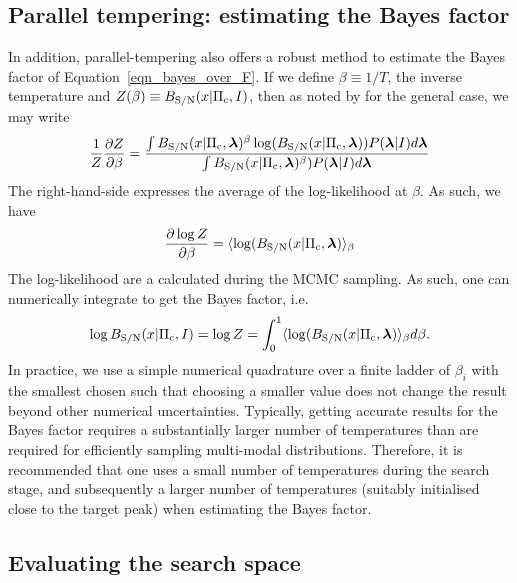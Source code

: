 \documentclass[aps, prd, twocolumn, superscriptaddress, floatfix, showpacs, nofootinbib, longbibliography]{revtex4-1}
\begin{document}
\subsection{Parallel tempering: estimating the Bayes factor}
In addition, parallel-tempering also offers a robust method to estimate the
Bayes factor of Equation~\eqref{eqn_bayes_over_F}. If we define
$\beta\equiv1/T$, the inverse temperature and $Z(\beta)\equiv B_{\rm S/N}(x| \Pi_{\rm
c}, I)$, then as noted by \citet{goggans2004} for the general case, we may
write
\begin{align}
\frac{1}{Z} \frac{\partial Z}{\partial \beta}=
\frac{
\int B_{\rm S/N}(x| \Pi_{\rm c}, \boldsymbol{\mathbf{\lambda}})^{\beta}
\log(B_{\rm S/N}(x| \Pi_{\rm c}, \boldsymbol{\mathbf{\lambda}}))P(\boldsymbol{\mathbf{\lambda}}| I)
d\boldsymbol{\mathbf{\lambda}}
}
{
\int B_{\rm S/N}(x| \Pi_{\rm c}, \boldsymbol{\mathbf{\lambda}})^{\beta})P(\boldsymbol{\mathbf{\lambda}}| I)
d\boldsymbol{\mathbf{\lambda}}
}
\end{align}
The right-hand-side expresses the average of the log-likelihood at $\beta$. As
such, we have
\begin{align}
\frac{\partial \log Z}{\partial \beta} =
\langle \log(B_{\rm S/N}(x| \Pi_{\rm c}, \boldsymbol{\mathbf{\lambda}}) \rangle_{\beta}
\end{align}
The log-likelihood are a calculated during the MCMC sampling. As such, one
can numerically integrate to get the Bayes factor, i.e.
\begin{align}
\log B_{\rm S/N}(x| \Pi_{\rm c}, I) = \log Z = \int_{0}^{1}
\langle \log(B_{\rm S/N}(x| \Pi_{\rm c}, \boldsymbol{\mathbf{\lambda}}) \rangle_{\beta} d\beta.
\end{align}
In practice, we use a simple numerical quadrature over a finite ladder of
$\beta_i$ with the smallest chosen such that choosing a smaller value does not
change the result beyond other numerical uncertainties. Typically, getting
accurate results for the Bayes factor requires a substantially larger number of
temperatures than are required for efficiently sampling multi-modal
distributions.  Therefore, it is recommended that one uses a small number of
temperatures during the search stage, and subsequently a larger number of
temperatures (suitably initialised close to the target peak) when estimating
the Bayes factor.

\subsection{Evaluating the search space}
\end{document}
